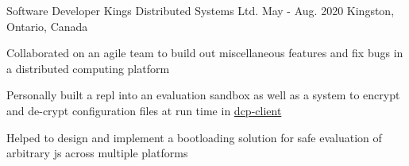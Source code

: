 \begin{cventries}
  \cventry
    {Software Developer} %
    {Kings Distributed Systems Ltd.} %
    {May - Aug. 2020} %
    {Kingston, Ontario, Canada} %
    {
      \begin{cvitems} %
        \item{Collaborated on an agile team to build out miscellaneous features and fix bugs in a distributed computing platform}
        \item{Personally built a repl into an evaluation sandbox as well as a system to encrypt and de-crypt configuration files at run time in \href{https://www.npmjs.com/package/dcp-client}{dcp-client}}
        \item{Helped to design and implement a bootloading solution for safe evaluation of arbitrary js across multiple platforms}
      \end{cvitems}
    }


\end{cventries}
